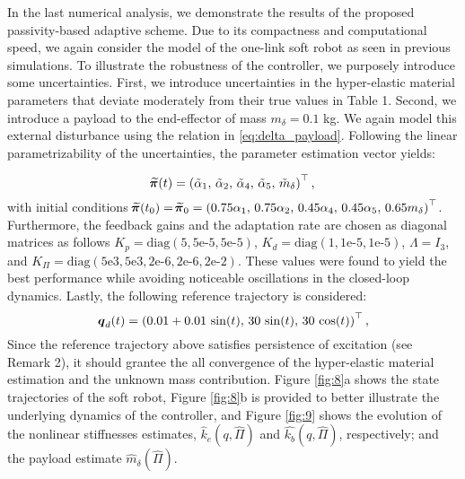 \begin{example}
\noindent In the last numerical analysis, we demonstrate the results of the proposed passivity-based adaptive scheme. Due to its compactness and computational speed, we again consider the model of the one-link soft robot as seen in previous simulations. To illustrate the robustness of the controller, we purposely introduce some uncertainties. First, we introduce uncertainties in the hyper-elastic material parameters that deviate moderately from their true values in Table 1. Second, we introduce a payload to the end-effector of mass $m_\delta = 0.1$ kg. We again model this external disturbance using the relation in \eqref{eq:delta_payload}. Following the linear parametrizability of the uncertainties, the parameter estimation vector yields:
\end{example}
%
\begin{equation}
\widetilde{\!\boldsymbol{\pi}}(t) = \left( \tilde{\alpha}_1,\,\tilde{\alpha}_2,\,\tilde{\alpha}_4,\, \tilde{\alpha}_5,\, \tilde{m}_\delta\right)^\top,
\end{equation}
%
with initial conditions $\widetilde{\!\boldsymbol{\pi}}(t_0) = \widetilde{\!\boldsymbol{\pi}}_0 = \left(0.75 {\alpha}_1,\,0.75{\alpha}_2,\,0.45{\alpha}_4,\, 0.45{\alpha}_5,\, 0.65{m}_\delta\right)^\top$. Furthermore, the feedback gains and the adaptation rate are chosen as diagonal matrices as follows $K_p = \text{diag}(5,5\text{e-}5,5\text{e-}5)
$, $K_d = \text{diag}(1,1\text{e-}5,1\text{e-}5)$, $\Lambda = I_3$, and $K_\Pi =  \text{diag}(5\text{e}3,5\text{e}3,2\text{e-}6,2\text{e-}6,2\text{e-}2)$. These values were found to yield the best performance while avoiding noticeable oscillations in the closed-loop dynamics. Lastly, the following reference trajectory is considered:
%
\begin{equation}
{\boldsymbol{q}}_d(t) = \left(0.01 + 0.01\,\sin(t),\, 30 \,\sin(t),\, 30 \,\cos(t)\right)^\top,
\end{equation}
%
Since the reference trajectory above satisfies persistence of
excitation (see Remark 2), it should grantee the all convergence of the hyper-elastic material estimation and the unknown mass contribution. Figure \ref{fig:8}a shows the state trajectories of the soft robot, Figure \ref{fig:8}b is provided to better illustrate the underlying dynamics of the controller, and Figure \ref{fig:9} shows the evolution of the nonlinear stiffnesses estimates, $\hat{k}_e(q,\hat{\Pi})$ and $\hat{k_b}(q,\hat{\Pi})$, respectively; and the payload estimate $\hat{m}_\delta(\hat{\Pi})$.

